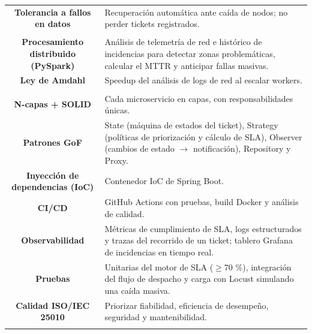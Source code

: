 \documentclass[11pt]{article}
\begin{document}
\begin{longtable}{C A}
\textbf{Tolerancia a fallos en datos} & Recuperación automática ante caída de nodos; no perder tickets registrados.\\
\addlinespace[1pt]
\\
\textbf{Procesamiento distribuido (PySpark)} & Análisis de telemetría de red e histórico de incidencias para detectar zonas problemáticas, calcular el MTTR y anticipar fallas masivas.\\
\textbf{Ley de Amdahl} & Speedup del análisis de logs de red al escalar workers.\\
\addlinespace[1pt]
\\
\textbf{N-capas + SOLID} & Cada microservicio en capas, con responsabilidades únicas.\\
\textbf{Patrones GoF} & State (máquina de estados del ticket), Strategy (políticas de priorización y cálculo de SLA), Observer (cambios de estado $\rightarrow$ notificación), Repository y Proxy.\\
\textbf{Inyección de dependencias (IoC)} & Contenedor IoC de Spring Boot.\\
\textbf{CI/CD} & GitHub Actions con pruebas, build Docker y análisis de calidad.\\
\textbf{Observabilidad} & Métricas de cumplimiento de SLA, logs estructurados y trazas del recorrido de un ticket; tablero Grafana de incidencias en tiempo real.\\
\textbf{Pruebas} & Unitarias del motor de SLA ($\geq$70 \%), integración del flujo de despacho y carga con Locust simulando una caída masiva.\\
\textbf{Calidad ISO/IEC 25010} & Priorizar fiabilidad, eficiencia de desempeño, seguridad y mantenibilidad.\\
\addlinespace[1pt]
\end{longtable}
\end{document}
